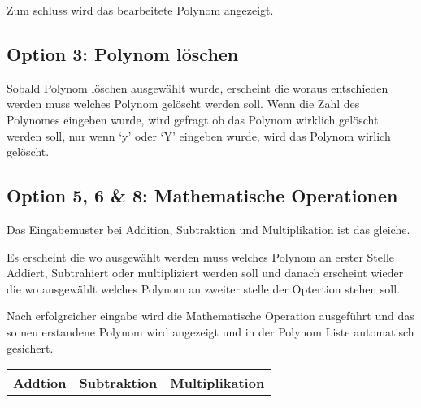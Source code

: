 \documentclass[letterpaper,10pt,ngerman]{sphinxmanual}
\begin{document}
Zum schluss wird das bearbeitete Polynom angezeigt.



\subsection{Option 3: Polynom löschen}
\label{menu:option-3-polynom-loschen}
Sobald Polynom löschen ausgewählt wurde, erscheint die  woraus entschieden werden muss
welches Polynom gelöscht werden soll. Wenn die Zahl des Polynomes eingeben wurde, wird gefragt ob das
Polynom wirklich gelöscht werden soll, nur wenn `y' oder `Y' eingeben wurde, wird das Polynom wirlich
gelöscht.



\subsection{Option 5, 6 \& 8: Mathematische Operationen}
\label{menu:option-5-6-8-mathematische-operationen}
Das Eingabemuster bei Addition, Subtraktion und Multiplikation ist das gleiche.

Es erscheint die  wo ausgewählt werden muss welches Polynom an erster Stelle Addiert,
Subtrahiert oder multipliziert werden soll und danach erscheint wieder die  wo ausgewählt
welches Polynom an zweiter stelle der Optertion stehen soll.

Nach erfolgreicher eingabe wird die Mathematische Operation ausgeführt und das so neu erstandene Polynom
wird angezeigt und in der Polynom Liste automatisch gesichert.

\noindent\begin{tabulary}{\linewidth}{|L|L|L|}
\hline
\textsf{\relax 
Addtion
\unskip}\relax &\textsf{\relax 
Subtraktion
\unskip}\relax &\textsf{\relax 
Multiplikation
\unskip}\relax \\
\hline
\noindent{}
&
\noindent{}
&
\noindent{}
\\
\hline\end{tabulary}
\end{document}
